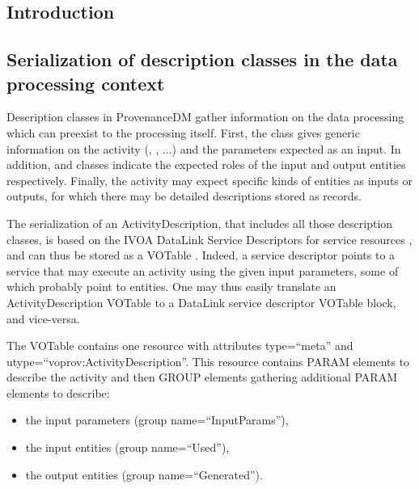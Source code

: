 \subsection{Introduction}
\label{sec:intro-serialization}


\subsection{Serialization of description classes in the data processing context}
\label{sec:description-serialization}

Description classes in ProvenanceDM gather information on the data processing which can preexist to the processing itself.
First, the  class gives generic information on the activity (, , ...) and the parameters expected as an input. In addition,  and  classes indicate the expected roles of the input and output entities respectively. Finally, the activity may expect specific kinds of entities as inputs or outputs, for which there may be detailed descriptions stored as  records.

The serialization of an ActivityDescription, that includes all those description classes, is based on the IVOA DataLink Service Descriptors for service resources \citep{std:Datalink}, and can thus be stored as a VOTable \citep{std:VOTABLE}. Indeed, a service descriptor points to a service that may execute an activity using the given input parameters, some of which probably point to entities. One may thus easily translate an ActivityDescription VOTable to a DataLink service descriptor VOTable block, and vice-versa.

The VOTable contains one resource with attributes type=``meta'' and utype=``voprov:ActivityDescription''. This resource contains PARAM elements to describe the activity and then GROUP elements gathering additional PARAM elements to describe:
\begin{itemize}
 \item the input parameters (group name=``InputParams''),
 \item the input entities (group name=``Used''),
 \item the output entities (group name=``Generated''). 
 \end{itemize}
 
